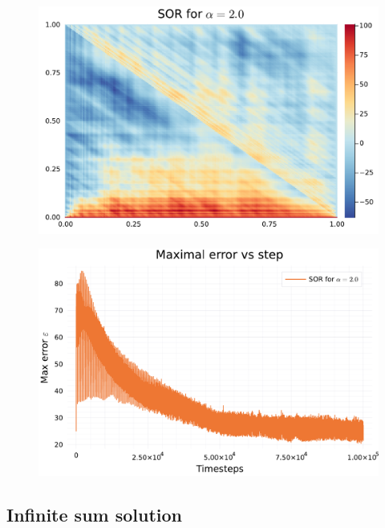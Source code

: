 \documentclass[
	a4paper, %
	10pt, %
]{CSUniSchoolLabReport}
\begin{document}
\begin{figure}[H]
	\centering
	\includegraphics[width=\textwidth]{../saves/broken_SOR_heatmap.pdf}
	\caption{}
\end{figure}

\begin{figure}[H]
	\centering
	\includegraphics[width=\textwidth]{../saves/broken_SOR_error.pdf}
	\caption{}
\end{figure}

\subsection{Infinite sum solution}
\end{document}
